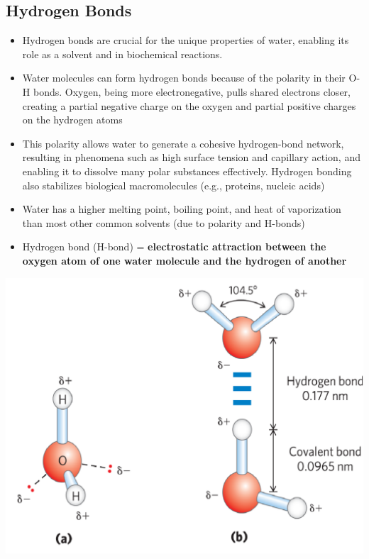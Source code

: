 \documentclass[10pt]{article}
\begin{document}
\subsection*{Hydrogen Bonds}
\begin{itemize}
    \item Hydrogen bonds are crucial for the unique properties of water, enabling its role as a solvent and in biochemical reactions.
    \item Water molecules can form hydrogen bonds because of the polarity in their O-H bonds.  Oxygen, being more electronegative, pulls shared electrons closer, creating a partial negative charge on the oxygen and partial positive charges on the hydrogen atoms
    \item This polarity allows water to generate a cohesive hydrogen-bond network, resulting in phenomena such as high surface tension and capillary action, and enabling it to dissolve many polar substances effectively.  Hydrogen bonding also stabilizes biological macromolecules (e.g., proteins, nucleic acids)
    \item Water has a higher melting point, boiling point, and heat of vaporization than most other common solvents (due to polarity and H-bonds)
    \item Hydrogen bond (H-bond) = \textbf{electrostatic attraction between the oxygen atom of one water molecule and the hydrogen of another}
\end{itemize}
\begin{center}
    \includegraphics[scale=0.5]{L2_2.png}
\end{center}
\end{document}
